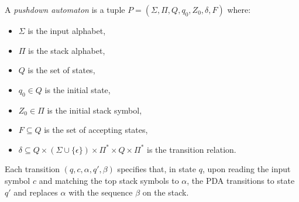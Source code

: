 \begin{definition}
    \label{def:PDA}
    A \emph{pushdown automaton} is a tuple $P = (\Sigma, \Pi, Q, q_0, Z_0, \delta, F)$ where:
    \begin{itemize}
        \item $\Sigma$ is the input alphabet,
        \item $\Pi$ is the stack alphabet,
        \item $Q$ is the set of states,
        \item $q_0 \in Q$ is the initial state,
        \item $Z_0 \in \Pi$ is the initial stack symbol,
        \item $F \subseteq Q$ is the set of accepting states,
        \item $\delta \subseteq Q \times (\Sigma \cup \{\epsilon\}) \times \Pi^* \times Q \times \Pi^*$ is the transition relation.
    \end{itemize}

    Each transition $(q, c, \alpha, q', \beta)$ specifies that, in state $q$, upon reading the input symbol $c$ and matching the top stack symbols to $\alpha$, the PDA transitions to state $q'$ and replaces $\alpha$ with the sequence $\beta$ on the stack.

\end{definition}
